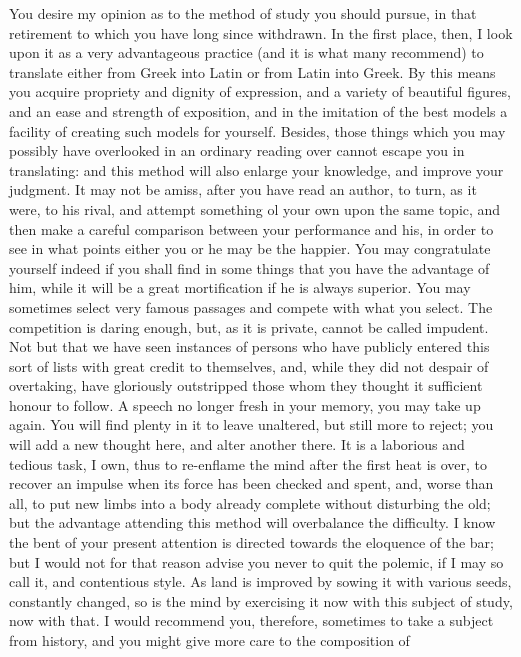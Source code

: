 You desire my opinion as to the method of study you should pursue, in that
retirement to which you have long since withdrawn. In the first place,
then, I look upon it as a very advantageous practice (and it is what many
recommend) to translate either from Greek into Latin or from Latin into
Greek. By this means you acquire propriety and dignity of expression, and
a variety of beautiful figures, and an ease and strength of exposition,
and in the imitation of the best models a facility of creating such models
for yourself. Besides, those things which you may possibly have overlooked
in an ordinary reading over cannot escape you in translating: and this
method will also enlarge your knowledge, and improve your judgment. It may
not be amiss, after you have read an author, to turn, as it were, to his
rival, and attempt something ol your own upon the same topic, and then
make a careful comparison between your performance and his, in order to
see in what points either you or he may be the happier. You may
congratulate yourself indeed if you shall find in some things that you
have the advantage of him, while it will be a great mortification if he is
always superior. You may sometimes select very famous passages and compete
with what you select. The competition is daring enough, but, as it is
private, cannot be called impudent. Not but that we have seen instances of
persons who have publicly entered this sort of lists with great credit to
themselves, and, while they did not despair of overtaking, have gloriously
outstripped those whom they thought it sufficient honour to follow. A
speech no longer fresh in your memory, you may take up again. You will
find plenty in it to leave unaltered, but still more to reject; you will
add a new thought here, and alter another there. It is a laborious and
tedious task, I own, thus to re-enflame the mind after the first heat is
over, to recover an impulse when its force has been checked and spent,
and, worse than all, to put new limbs into a body already complete without
disturbing the old; but the advantage attending this method will
overbalance the difficulty. I know the bent of your present attention is
directed towards the eloquence of the bar; but I would not for that reason
advise you never to quit the polemic, if I may so call it, and contentious
style. As land is improved by sowing it with various seeds, constantly
changed, so is the mind by exercising it now with this subject of study,
now with that. I would recommend you, therefore, sometimes to take a
subject from history, and you might give more care to the composition of
